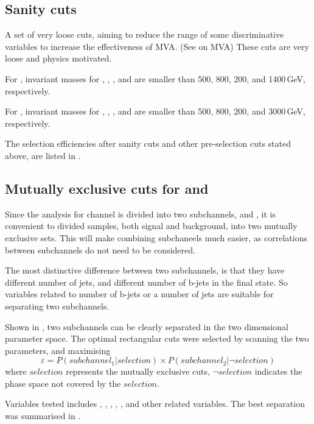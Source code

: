 \subsection{Sanity cuts}

A set of very loose cuts, aiming to reduce the range of some discriminative variables to increase the effectiveness of MVA. (See \Section{} on MVA) These cuts are very loose and physics motivated.

For , invariant masses for \Hbb, \HWW, \PW, and \HH are smaller than 500, 800, 200, and 1400\,GeV, respectively.

For , invariant masses for \Hbb, \HWW, \PW, and \HH are smaller than 500, 800, 200, and 3000\,GeV, respectively.

The selection efficiencies after sanity cuts and other pre-selection cuts stated above, are listed in \Table{}.

\subsection{Mutually exclusive cuts for \eeToHHbbWW and \eeToHHbbbb}

Since the analysis for \eeToHH channel is divided into two subchannels, \eeToHHbbWWHad and \eeToHHbbbb, it is convenient to divided samples, both signal and background, into two mutually exclusive sets. This will make combining subchaneels much easier, as correlations between subchannels do not need to be considered.

The most distinctive difference between two subchannels, is that they have different number of jets, and different number of b-jets in the final state. So variables related to number of b-jets or a number of jets are suitable for separating two subchannels.

Shown in , two subchannels can be clearly separated in the two dimensional parameter space. The optimal rectangular cuts were selected by scanning the two parameters, and maximising
\begin{equation}
\varepsilon = P(subchannel_1|selection) \times P(subchannel_2|\neg{selection})
\end{equation}
where $selection$ represents the mutually exclusive cuts, $\neg{selection}$ indicates the phase space not covered by the $selection$.

Variables tested includes , , , , ,  and other related variables. The best separation was summarised in .

